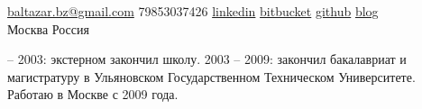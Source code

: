 \documentclass[unicode, 10pt, a4paper, oneside, fleqn]{article}
\begin{document}
\sloppy  %


\nobreakvspace{0.3em}  %

\noindent\href{mailto:baltazar.dot.bz.at.gmail.dot.com}{baltazar.bz\mbox{}@\mbox{}gmail.com}\sbull
\textsmaller{+}79853037426\sbull
\href{http://ru.linkedin.com/pub/yuri-bochkarev/21/3a9/555}{linkedin}
\sbull
\href{https://bitbucket.org/balta2ar}{bitbucket}
\sbull
\href{https://github.org/balta2ar}{github}
\sbull
\href{http://baltazar-bz.blogspot.com/}{blog}
\\
Москва\sbull
Россия
\spacedhrule{0.8em}{-0.4em}  %


\vspace{0em}  %

 -- 2003: экстерном закончил школу. 2003 -- 2009: закончил бакалавриат и
магистратуру в Ульяновском Государственном Техническом Университете. Работаю в
Москве с 2009 года.
\spacedhrule{0.6em}{-0.4em}

\end{document}
